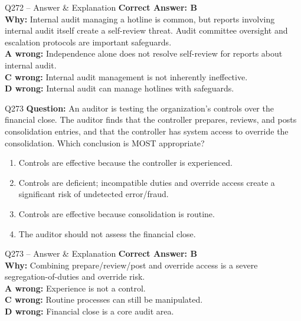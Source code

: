 \documentclass[aspectratio=169,10pt]{beamer}
\begin{document}
	\begin{frame}[t]{Q272 -- Answer \& Explanation}
		\small
		\textbf{Correct Answer: B} \\[4pt]
		\textbf{Why:} Internal audit managing a hotline is common, but reports involving internal audit itself create a self-review threat. Audit committee oversight and escalation protocols are important safeguards. \\[4pt]
		\textbf{A wrong:} Independence alone does not resolve self-review for reports about internal audit. \\[2pt]
		\textbf{C wrong:} Internal audit management is not inherently ineffective. \\[2pt]
		\textbf{D wrong:} Internal audit can manage hotlines with safeguards.
	\end{frame}
	
	\begin{frame}[t]{Q273}
		\small
		\textbf{Question:} An auditor is testing the organization's controls over the financial close. The auditor finds that the controller prepares, reviews, and posts consolidation entries, and that the controller has system access to override the consolidation. Which conclusion is MOST appropriate?
		\begin{enumerate}[label=\Alph*.,itemsep=1pt,topsep=2pt]
			\item Controls are effective because the controller is experienced.
			\item Controls are deficient; incompatible duties and override access create a significant risk of undetected error/fraud.
			\item Controls are effective because consolidation is routine.
			\item The auditor should not assess the financial close.
		\end{enumerate}
	\end{frame}
	
	\begin{frame}[t]{Q273 -- Answer \& Explanation}
		\small
		\textbf{Correct Answer: B} \\[4pt]
		\textbf{Why:} Combining prepare/review/post and override access is a severe segregation-of-duties and override risk. \\[4pt]
		\textbf{A wrong:} Experience is not a control. \\[2pt]
		\textbf{C wrong:} Routine processes can still be manipulated. \\[2pt]
		\textbf{D wrong:} Financial close is a core audit area.
	\end{frame}
	
\end{document}

